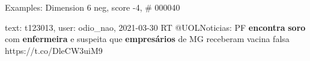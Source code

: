 \begin{frame}{Examples: Dimension 6 neg, score -4, \# 000040}
\footnotesize
\begin{alertblock}{text: t123013, user: odio\_nao, 2021-03-30}
RT @UOLNoticias: PF \textbf{encontra} \textbf{soro} com \textbf{enfermeira} e 
suspeita que \textbf{empresários} de MG receberam vacina falsa 
https://t.co/DleCW3uiM9 
\end{alertblock}
\end{frame}
